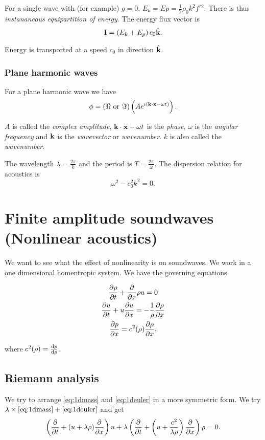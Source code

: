 \documentclass{notes}
\newcommand{\vk}{\vect{k}}
\begin{document}
For a single wave with (for example) $g=0$, $E_k = Ep = \tfrac{1}{2}
\rho_0 k^2 f'{}^2$.  There is thus \emph{instananeous equipartition
of energy}.  The energy flux vector is
\[
\vect{I} = \left( E_k + E_p \right) c_0 \Hat{\vk}.
\]

Energy is transported at a speed $c_0$ in direction $\Hat{\vk}$.

\subsubsection*{Plane harmonic waves}

For a plane harmonic wave we have
\[
\phi = \left( \Re \text{ or } \Im\right) \left( A
e^{\imath \left(\vk \cdot \vx - \omega t \right)} \right).
\]

$A$ is called the \emph{complex amplitude}, $\vk \cdot \vx - \omega t$
is the \emph{phase}, $\omega$ is the \emph{angular frequency}
and $\vk$ is the \emph{wavevector} or \emph{wavenumber}.  $k$
is also called the \emph{wavenumber}.

The wavelength $\lambda = \frac{2 \pi}{k}$ and the period
is $T = \frac{2 \pi}{\omega}$.  The dispersion relation for
acoustics is
\[
\omega^2 - c_0^2 k^2 = 0.
\]

\section[Nonlinear acoustics]%
{Finite amplitude soundwaves (Nonlinear acoustics)}

We want to see what the effect of nonlinearity is on soundwaves.  We
work in a one dimensional homentropic system.  We have the governing
equations

\begin{gather}
\frac{\partial \rho}{\partial t} + \frac{\partial }{\partial x} \rho u = 0 \label{eq:1dmass} \\
\frac{\partial u}{\partial t} + u \frac{\partial u}{\partial x} = - \frac{1}{\rho} \frac{\partial \rho}{\partial x} \label{eq:1deuler} \\
\frac{\partial p}{\partial x} = c^2(\rho) \frac{\partial \rho}{\partial x} \label{eq:1dpress},
\end{gather}

where $c^2(\rho) = \frac{\mathrm{d} p}{\mathrm{d}\rho}$.

\subsection{Riemann analysis}

We try to arrange \eqref{eq:1dmass} and \eqref{eq:1deuler} in a more
symmetric form.  We try $\lambda \times \eqref{eq:1dmass}
+ \eqref{eq:1deuler}$ and get
\[
\left( \frac{\partial }{\partial t} + ( u+ \lambda \rho) \frac{\partial }{\partial x}\right) u + \lambda \left(
\frac{\partial }{\partial t} + \left( u + \frac{c^2}{\lambda \rho} \right) \frac{\partial }{\partial x}
\right) \rho = 0.
\]
\end{document}
